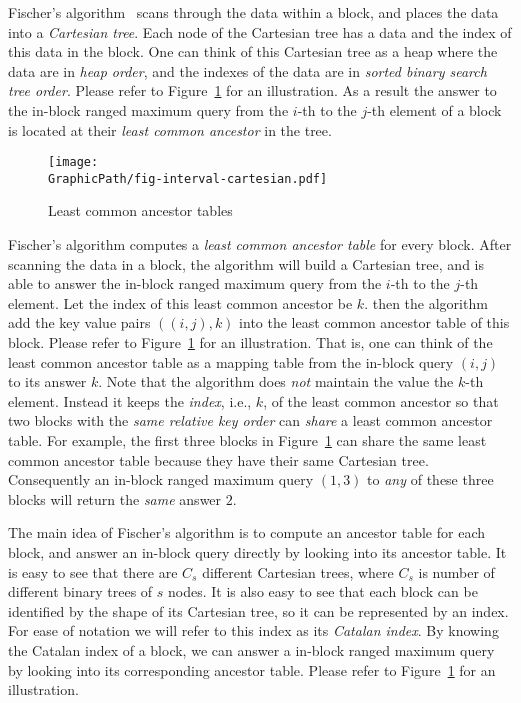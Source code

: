 Fischer's algorithm~\cite{Fischer2006TheoreticalAP} scans through the
data within a block, and places the data into a {\em Cartesian tree}.
Each node of the Cartesian tree has a data and the index of this data
in the block.  One can think of this Cartesian tree as a heap where
the data are in {\em heap order}, and the indexes of the data are in
{\em sorted binary search tree order}.  Please refer to
Figure~\ref{fig:ancesstor-cartesian} for an illustration.  As a result
the answer to the in-block ranged maximum query from the $i$-th to the
$j$-th element of a block is located at their {\em least common
  ancestor} in the tree.

\begin{figure}[htbp]   
  \centering
  \texttt{[image: \\GraphicPath/fig-interval-cartesian.pdf]}
  \caption{Least common ancestor tables}
  \label{fig:ancesstor-cartesian}
\end{figure}

Fischer's algorithm computes a {\em least common ancestor table} for
every block.  After scanning the data in a block, the algorithm will
build a Cartesian tree, and is able to answer the in-block ranged
maximum query from the $i$-th to the $j$-th element.  Let the index of
this least common ancestor be $k$. then the algorithm add the key
value pairs $((i, j), k)$ into the least common ancestor table of this
block.  Please refer to Figure~\ref{fig:ancesstor-cartesian} for an
illustration.  That is, one can think of the least common ancestor
table as a mapping table from the in-block query $(i, j)$ to its
answer $k$.  Note that the algorithm does {\em not} maintain the value
the $k$-th element.  Instead it keeps the {\em index}, i.e., $k$, of
the least common ancestor so that two blocks with the {\em same
  relative key order} can {\em share} a least common ancestor table.
For example, the first three blocks in
Figure~\ref{fig:ancesstor-cartesian} can share the same least common
ancestor table because they have their same Cartesian tree.
Consequently an in-block ranged maximum query $(1, 3)$ to {\em any} of
these three blocks will return the {\em same} answer $2$.

The main idea of Fischer's algorithm is to compute an ancestor table
for each block, and answer an in-block query directly by looking into
its ancestor table.  It is easy to see that there are $C_s$ different
Cartesian trees, where $C_s$ is number of different binary trees of
$s$ nodes.  It is also easy to see that each block can be identified
by the shape of its Cartesian tree, so it can be represented by an
index.  For ease of notation we will refer to this index as its {\em
  Catalan index}.  By knowing the Catalan index of a block, we can
answer a in-block ranged maximum query by looking into its
corresponding ancestor table.  Please refer to
Figure~\ref{fig:ancesstor-cartesian} for an illustration.

